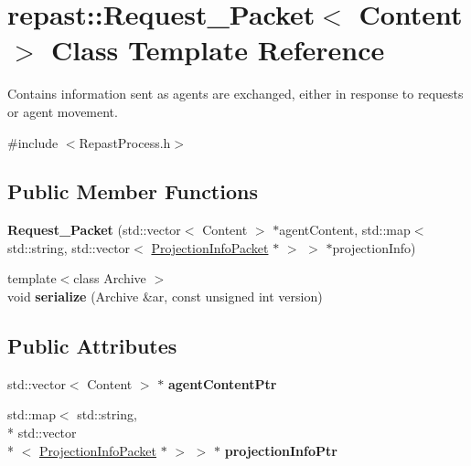\hypertarget{classrepast_1_1_request___packet}{\section{repast\-:\-:Request\-\_\-\-Packet$<$ Content $>$ Class Template Reference}
\label{classrepast_1_1_request___packet}
}


Contains information sent as agents are exchanged, either in response to requests or agent movement.  




{\ttfamily \#include $<$Repast\-Process.\-h$>$}

\subsection*{Public Member Functions}
\begin{DoxyCompactItemize}
\item 
\hypertarget{classrepast_1_1_request___packet_a533d224a16012ea64470f1dbb62877d2}{{\bfseries Request\-\_\-\-Packet} (std\-::vector$<$ Content $>$ $\ast$agent\-Content, std\-::map$<$ std\-::string, std\-::vector$<$ \hyperlink{classrepast_1_1_projection_info_packet}{Projection\-Info\-Packet} $\ast$ $>$ $>$ $\ast$projection\-Info)}\label{classrepast_1_1_request___packet_a533d224a16012ea64470f1dbb62877d2}

\item 
\hypertarget{classrepast_1_1_request___packet_abb795210d8ed989db6c0f03a74883751}{{\footnotesize template$<$class Archive $>$ }\\void {\bfseries serialize} (Archive \&ar, const unsigned int version)}\label{classrepast_1_1_request___packet_abb795210d8ed989db6c0f03a74883751}

\end{DoxyCompactItemize}
\subsection*{Public Attributes}
\begin{DoxyCompactItemize}
\item 
\hypertarget{classrepast_1_1_request___packet_a59c95fb4b18c6196f9b2add885b272e1}{std\-::vector$<$ Content $>$ $\ast$ {\bfseries agent\-Content\-Ptr}}\label{classrepast_1_1_request___packet_a59c95fb4b18c6196f9b2add885b272e1}

\item 
\hypertarget{classrepast_1_1_request___packet_aa95c5672630f536c4f4c57c39b78fa1c}{std\-::map$<$ std\-::string, \\*
std\-::vector\\*
$<$ \hyperlink{classrepast_1_1_projection_info_packet}{Projection\-Info\-Packet} $\ast$ $>$ $>$ $\ast$ {\bfseries projection\-Info\-Ptr}}\label{classrepast_1_1_request___packet_aa95c5672630f536c4f4c57c39b78fa1c}

\end{DoxyCompactItemize}
